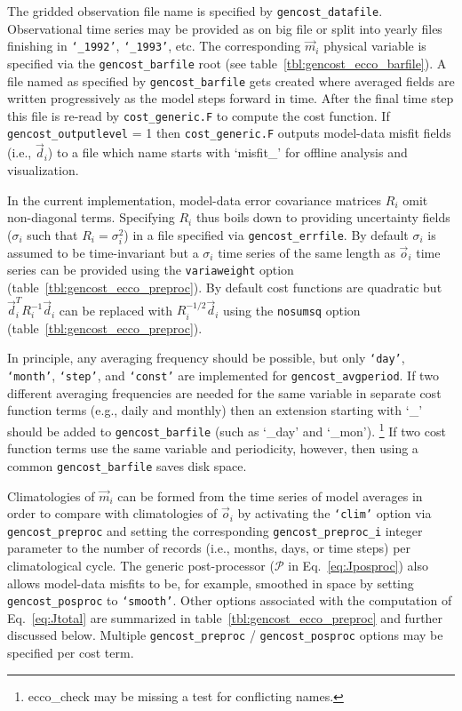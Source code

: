  \noindent
The gridded observation file name is specified by \texttt{gencost\_datafile}. Observational time series may be provided as on big file or split into yearly files finishing in \texttt{`\_1992'}, \texttt{`\_1993'}, etc. The corresponding $\vec{m}_i$ physical variable is specified via the \texttt{gencost\_barfile} root (see table~\ref{tbl:gencost_ecco_barfile}). A file named as specified by \texttt{gencost\_barfile} gets created where averaged fields are written progressively as the model steps forward in time. After the final time step this file is re-read by \texttt{cost\_generic.F} to compute the cost function. If \texttt{gencost\_outputlevel} = 1 then \texttt{cost\_generic.F} outputs model-data misfit fields (i.e., $\vec{d}_i$) to a file which name starts with `misfit\_' for offline analysis and visualization.

In the current implementation, model-data error covariance matrices $R_i$ omit non-diagonal terms. Specifying $R_i$ thus boils down to providing uncertainty fields ($\sigma_i$ such that $R_i=\sigma_i^2$) in a file specified via \texttt{gencost\_errfile}. By default $\sigma_i$ is assumed to be time-invariant but a $\sigma_i$ time series of the same length as $\vec{o}_i$ time series can be provided using the \texttt{variaweight} option (table~\ref{tbl:gencost_ecco_preproc}). By default cost functions are quadratic but $\vec{d}_i^T R_i^{-1} \vec{d}_i$ can be replaced with $R_i^{-1/2} \vec{d}_i$ using the \texttt{nosumsq} option (table~\ref{tbl:gencost_ecco_preproc}). 

In principle, any averaging frequency should be possible, but only \texttt{`day'}, \texttt{`month'}, \texttt{`step'}, and \texttt{`const'} are implemented for \texttt{gencost\_avgperiod}. If two different averaging frequencies are needed for the same variable in separate cost function terms (e.g., daily and monthly) then an extension starting with `\_' should be added to \texttt{gencost\_barfile} (such as `\_day' and `\_mon').
\footnote{ecco\_check may be missing a test for conflicting names.} If two cost function terms use the same variable and periodicity, however, then using a common \texttt{gencost\_barfile} saves disk space. 

Climatologies of $\vec{m}_i$ can be formed from the time series of model averages in order to compare with climatologies of $\vec{o}_i$ by activating the \texttt{`clim'} option via \texttt{gencost\_preproc} and setting the corresponding \texttt{gencost\_preproc\_i}  integer parameter to the number of records (i.e., months, days, or time steps) per climatological cycle. The generic post-processor ($\mathcal{P}$ in Eq.~\eqref{eq:Jposproc}) also allows model-data misfits to be, for example, smoothed in space by setting \texttt{gencost\_posproc} to \texttt{`smooth'}. Other options associated with the computation of Eq.~\eqref{eq:Jtotal} are summarized in table~\ref{tbl:gencost_ecco_preproc} and further discussed below. Multiple \texttt{gencost\_preproc} / \texttt{gencost\_posproc} options may be specified per cost term. 

